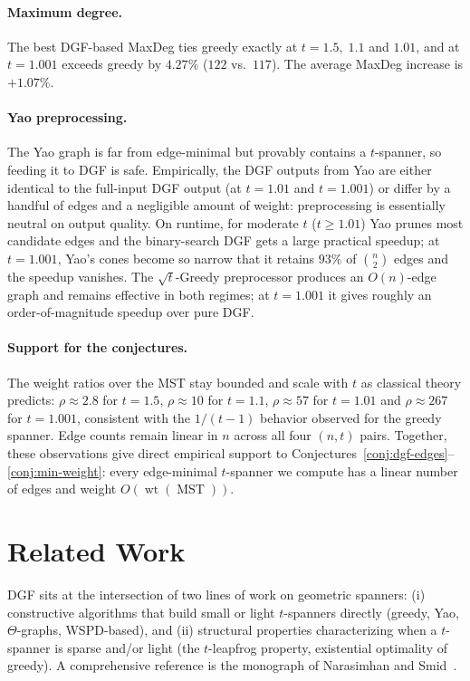 \documentclass{cccg26}
\DeclareMathOperator{\wt}{wt}
\DeclareMathOperator{\MST}{MST}
\begin{document}
\paragraph{Maximum degree.}
The best DGF-based MaxDeg ties greedy exactly at $t=1.5,\;1.1$ and
$1.01$, and at $t=1.001$ exceeds greedy by $4.27\%$ ($122$ vs.\
$117$). The average MaxDeg increase is $+1.07\%$.

\paragraph{Yao preprocessing.}
The Yao graph is far from edge-minimal but provably contains a
$t$-spanner, so feeding it to DGF is safe. Empirically, the DGF
outputs from Yao are either identical to the full-input DGF output
(at $t=1.01$ and $t=1.001$) or differ by a handful of edges and a
negligible amount of weight: preprocessing is essentially neutral on
output quality. On runtime, for moderate $t$ ($t\ge 1.01$) Yao
prunes most candidate edges and the binary-search DGF gets a large
practical speedup; at $t=1.001$, Yao's cones become so narrow that
it retains $93\%$ of $\binom{n}{2}$ edges and the speedup vanishes.
The $\sqrt{t}$-Greedy preprocessor produces an $O(n)$-edge
graph and remains effective in both regimes; at $t=1.001$ it gives
roughly an order-of-magnitude speedup over pure DGF.

\paragraph{Support for the conjectures.}
The weight ratios over the MST stay bounded and scale with $t$ as
classical theory predicts: $\rho\approx 2.8$ for $t=1.5$,
$\rho\approx 10$ for $t=1.1$, $\rho\approx 57$ for $t=1.01$ and
$\rho\approx 267$ for $t=1.001$, consistent with the $1/(t-1)$
behavior observed for the greedy spanner. Edge counts remain linear
in $n$ across all four $(n,t)$ pairs. Together, these observations
give direct empirical support to
Conjectures~\ref{conj:dgf-edges}--\ref{conj:min-weight}: every
edge-minimal $t$-spanner we compute has a linear number of edges
and weight $O(\wt(\MST))$.

\section{Related Work}
\label{sec:related-work}

DGF sits at the intersection of two lines of work on geometric
spanners: (i) constructive algorithms that build small or light
$t$-spanners directly (greedy, Yao, $\Theta$-graphs, WSPD-based), and
(ii) structural properties characterizing when a $t$-spanner is sparse
and/or light (the $t$-leapfrog property, existential optimality of
greedy). A comprehensive reference is the monograph of Narasimhan and
Smid~\cite{NS07}.
\end{document}
